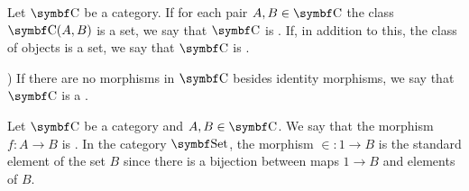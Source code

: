 \begin{definition}\label{def:category_cardinality}
  Let \( \Cat{C} \) be a category. If for each pair \( A, B \in \Cat{C} \) the class \( \Cat{C}(A, B) \) is a set, we say that \( \Cat{C} \) is . If, in addition to this, the class of objects is a set, we say that \( \Cat{C} \) is .
\end{definition}

\begin{definition}\label{def:discrete_category})
  If there are no morphisms in \( \Cat{C} \) besides identity morphisms, we say that \( \Cat{C} \) is a .
\end{definition}

\begin{definition}\label{def:generalized_element}
  Let \( \Cat{C} \) be a category and \( A, B \in \Cat{C} \). We say that the morphism \( f: A \to B \) is . In the category \( \Cat{Set} \), the morphism \( \in : 1 \to B \) is the standard element of the set \( B \) since there is a bijection between maps \( 1 \to B \) and elements of \( B \).
\end{definition}

